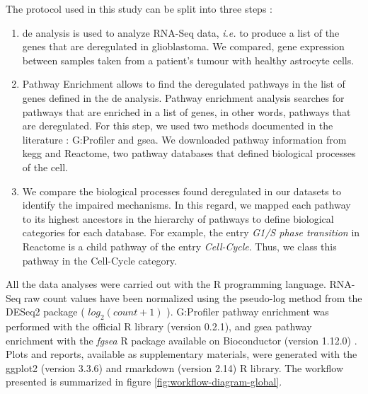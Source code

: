 The protocol used in this study can be split into three steps :
\begin{enumerate}
    \item \acrfull{de} analysis is used to analyze RNA-Seq data, \textit{i.e.} to produce a list of the genes that are deregulated in glioblastoma.
    We compared, gene expression between samples taken from a patient's tumour with healthy astrocyte cells.
    \item Pathway Enrichment allows to find the deregulated pathways in the list of genes defined in the \acrshort{de} analysis.
    Pathway enrichment analysis searches for pathways that are enriched in a list of genes, in other words, pathways that are deregulated.
    For this step, we used two methods documented in the literature : G:Profiler and \acrfull{gsea}.
    We downloaded pathway information from \acrfull{kegg} and Reactome, two pathway databases that defined biological processes of the cell.
    \item We compare the biological processes found deregulated in our datasets to identify the impaired mechanisms.
    In this regard, we mapped each pathway to its highest ancestors in the hierarchy of pathways to define biological categories for each database.
    For example, the entry \textit{G1/S phase transition} in Reactome is a child pathway of the entry \textit{Cell-Cycle}.
    Thus, we class this pathway in the Cell-Cycle category.
\end{enumerate}
All the data analyses were carried out with the R programming language.
RNA-Seq raw count values have been normalized using the pseudo-log method from the DESeq2 package ( $log_2(count+1)$ ).
G:Profiler pathway enrichment was performed with the official R library (version 0.2.1), and \acrshort{gsea} pathway enrichment with the \textit{fgsea} R package available on Bioconductor (version 1.12.0) \cite*{Korotkevich2021}.
Plots and reports, available as supplementary materials, were generated with the ggplot2 (version 3.3.6) and rmarkdown (version 2.14) R library.
The workflow presented is summarized in figure \ref*{fig:workflow-diagram-global}.
